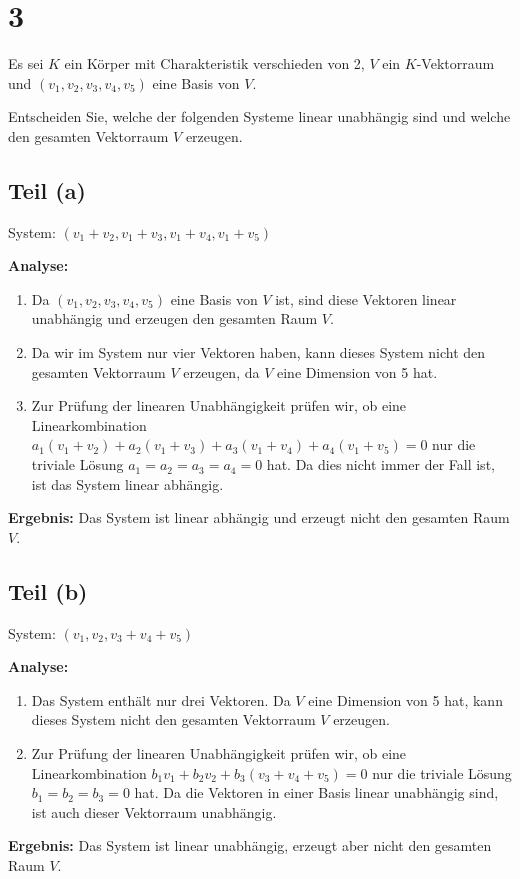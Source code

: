 \documentclass[11pt]{article}
\begin{document}
\section*{3}

Es sei \( K \) ein Körper mit Charakteristik verschieden von 2, \( V \) ein \( K \)-Vektorraum und \( (v_1, v_2, v_3, v_4, v_5) \) eine Basis von \( V \).

Entscheiden Sie, welche der folgenden Systeme linear unabhängig sind und welche den gesamten Vektorraum \( V \) erzeugen.

\subsection*{Teil (a)}

System: \( (v_1 + v_2, v_1 + v_3, v_1 + v_4, v_1 + v_5) \)

\textbf{Analyse:}

\begin{enumerate}
    \item Da \( (v_1, v_2, v_3, v_4, v_5) \) eine Basis von \( V \) ist, sind diese Vektoren linear unabhängig und erzeugen den gesamten Raum \( V \).
    \item Da wir im System nur vier Vektoren haben, kann dieses System nicht den gesamten Vektorraum \( V \) erzeugen, da \( V \) eine Dimension von 5 hat.
    \item Zur Prüfung der linearen Unabhängigkeit prüfen wir, ob eine Linearkombination \( a_1 (v_1 + v_2) + a_2 (v_1 + v_3) + a_3 (v_1 + v_4) + a_4 (v_1 + v_5) = 0 \) nur die triviale Lösung \( a_1 = a_2 = a_3 = a_4 = 0 \) hat. Da dies nicht immer der Fall ist, ist das System linear abhängig.
\end{enumerate}
\textbf{Ergebnis:} Das System ist linear abhängig und erzeugt nicht den gesamten Raum \( V \).

\subsection*{Teil (b)}

System: \( (v_1, v_2, v_3 + v_4 + v_5) \)

\textbf{Analyse:}

\begin{enumerate}
    \item Das System enthält nur drei Vektoren. Da \( V \) eine Dimension von 5 hat, kann dieses System nicht den gesamten Vektorraum \( V \) erzeugen.
    \item Zur Prüfung der linearen Unabhängigkeit prüfen wir, ob eine Linearkombination \( b_1 v_1 + b_2 v_2 + b_3 (v_3 + v_4 + v_5) = 0 \) nur die triviale Lösung \( b_1 = b_2 = b_3 = 0 \) hat. Da die Vektoren in einer Basis linear unabhängig sind, ist auch dieser Vektorraum unabhängig.
\end{enumerate}
\textbf{Ergebnis:} Das System ist linear unabhängig, erzeugt aber nicht den gesamten Raum \( V \).
\end{document}
